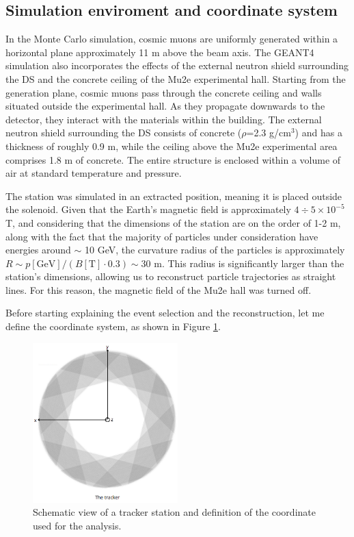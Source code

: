 \subsection{Simulation enviroment and coordinate system}\label{genplane}
In the Monte Carlo simulation, cosmic muons are uniformly generated within a horizontal plane approximately 11 m 
above the beam axis. The GEANT4 simulation also incorporates the effects of the external neutron shield surrounding the DS 
and the concrete ceiling of the Mu2e experimental hall. Starting from the generation plane, 
cosmic muons pass through the concrete ceiling and walls situated outside the experimental hall. 
As they propagate downwards to the detector, they interact with the materials within the building. 
The external neutron shield surrounding the DS consists of concrete ($\rho$=2.3 g/cm$^3$) and has a thickness of 
roughly 0.9 m, while the ceiling above the Mu2e experimental area comprises 1.8 m of concrete. 
The entire structure is enclosed within a volume of air at standard temperature and pressure.

The station was simulated in an extracted position, meaning it is placed outside the solenoid. 
Given that the Earth's magnetic field is approximately $4 \div 5 \times 10^{-5}$ T, 
and considering that the dimensions of the station are on the order of 1-2 m, 
along with the fact that the majority of particles under consideration have energies around $\sim$ 10 GeV, 
the curvature radius of the particles is approximately $R\sim p[\text{GeV}]/(B[\text{T}]\cdot 0.3) \sim 30$ m. 
This radius is significantly larger than the station's dimensions, allowing us to reconstruct particle trajectories as straight lines.
For this reason, the magnetic field of the Mu2e hall was turned off. 

Before starting explaining the event selection and the reconstruction, let me define the coordinate system, as shown in Figure \ref{fig:coordinate}.
\begin{figure}[!h]
    \centering
    \includegraphics[width =0.5\textwidth]{figures/png/Screenshot_20240526_164527.png}
    \caption{Schematic view of a tracker station and definition of the coordinate used for the analysis.}
    \label{fig:coordinate}
\end{figure}
